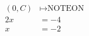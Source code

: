 \documentclass[preview]{standalone}
\begin{document}
\begin{align*}
(0,C) & \mapsto \text{NOTEON} \\ 2x & = -4 \\ x & = -2
\end{align*}
\end{document}
